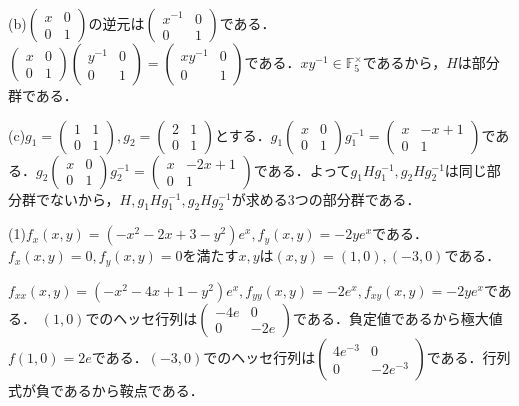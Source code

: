 \documentclass[
		book,
		head_space=20mm,
		foot_space=20mm,
		gutter=10mm,
		line_length=190mm
]{jlreq}
\begin{document}
(b)$\begin{pmatrix}
    x & 0\\
    0 & 1
    \end{pmatrix}$の逆元は$\begin{pmatrix}
    x^{-1} & 0\\
    0 & 1
    \end{pmatrix}$である．$\begin{pmatrix}
    x & 0\\
    0 & 1
    \end{pmatrix}\begin{pmatrix}
    y^{-1} & 0\\
    0 & 1
    \end{pmatrix}=\begin{pmatrix}
    xy^{-1} & 0\\
    0 & 1
    \end{pmatrix}$である．$xy^{-1}\in \mathbb{F}_5^{\times}$であるから，$H$は部分群である．

(c)$g_1=\begin{pmatrix}
    1 & 1\\
    0 & 1
\end{pmatrix},g_2=\begin{pmatrix}
    2 & 1\\
    0 & 1
    \end{pmatrix}$とする．$g_1\begin{pmatrix}
    x & 0\\
    0 & 1
    \end{pmatrix}g_1^{-1}=\begin{pmatrix}
    x & -x+1\\
    0 & 1
    \end{pmatrix}$である．$g_2\begin{pmatrix}
    x & 0\\
    0 & 1
    \end{pmatrix}g_2^{-1}=\begin{pmatrix}
    x & -2x+1\\
    0 & 1
    \end{pmatrix}$である．よって$g_1Hg_1^{-1},g_2Hg_2^{-1}$は同じ部分群でないから，$H,g_1Hg_1^{-1},g_2Hg_2^{-1}$が求める$3$つの部分群である．

(1)$f_x(x,y)=(-x^2-2x+3-y^2)e^x,f_y(x,y)=-2ye^x$である．
$f_x(x,y)=0,f_y(x,y)=0$を満たす$x,y$は$(x,y)=(1,0),(-3,0)$である．

$f_{xx}(x,y)=(-x^2-4x+1-y^2)e^x,f_{yy}(x,y)=-2e^x,f_{xy}(x,y)=-2ye^x$である．
$(1,0)$でのヘッセ行列は$\begin{pmatrix}
    -4e & 0\\
    0 & -2e
    \end{pmatrix}$である．負定値であるから極大値$f(1,0)=2e$である．$(-3,0)$でのヘッセ行列は$\begin{pmatrix}
        4e^{-3} & 0\\   
        0 & -2e^{-3}
        \end{pmatrix}$である．行列式が負であるから鞍点である．
\end{document}
